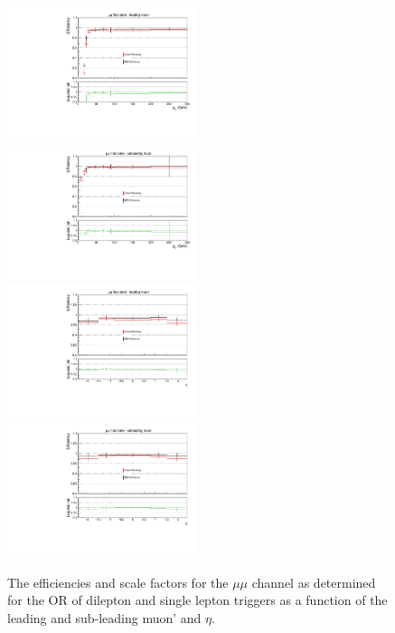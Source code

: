 \begin{figure}[ht]
\centering
\includegraphics[width=0.495\textwidth]{figs/background-estimation/triggerEfficiency/ttbar/muon1_pT_SF_alt.pdf}
\includegraphics[width=0.495\textwidth]{figs/background-estimation/triggerEfficiency/ttbar/muon2_pT_SF_alt.pdf}
\\
\includegraphics[width=0.495\textwidth]{figs/background-estimation/triggerEfficiency/ttbar/muon1_eta_SF_alt.pdf}
\includegraphics[width=0.495\textwidth]{figs/background-estimation/triggerEfficiency/ttbar/muon2_eta_SF_alt.pdf}
\caption{
The efficiencies and scale factors for the $\mu\mu$ channel as determined for the OR of dilepton and single lepton triggers as a function of the leading and sub-leading muon' \pT and $\eta$.
}
\label{fig:App_trigEff_mumu}
\end{figure}

